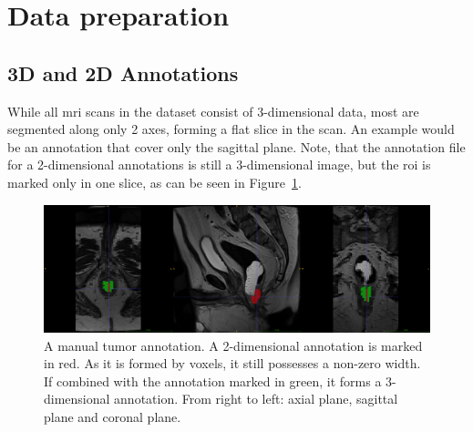 
\section{Data preparation}

\subsection{3D and 2D Annotations}


While all \ac{mri} scans in the dataset consist of 3-dimensional data, 
most are segmented along only 2 axes, forming a flat slice in the scan.
An example would be an annotation that cover only the sagittal plane. 
Note, that the annotation file for 
a 2-dimensional annotations is still a 3-dimensional image, but the 
\ac{roi} is marked only in one slice, as can be seen in Figure~\ref{fig:2dvs3d}.

\begin{figure}[H]
    \centering
    \includegraphics[width=1.0\textwidth]{img/mo0501229884a_marked.png}
    \caption{A manual tumor annotation. A 2-dimensional annotation is marked in red. As it is formed by voxels, it still possesses a non-zero width. If combined with the annotation marked in green, it forms a 3-dimensional annotation. From right to left: axial plane, sagittal plane and coronal plane.}\label{fig:2dvs3d}
\end{figure}

